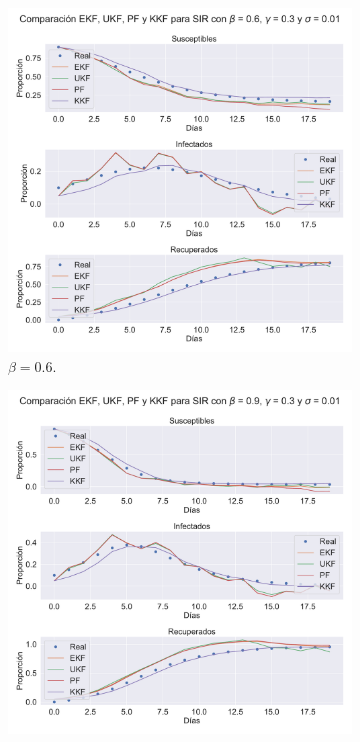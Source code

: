 \begin{figure}[h!]
    \centering
    \begin{subfigure}[b]{0.49\textwidth}
        \includegraphics[width=\linewidth]{img/content/chapter4/nonlinear_filters_sir_beta_06.pdf}
    \caption{$\beta = 0.6$.}
    \label{fig:nonlinear_filters_sir_beta_06}
    \end{subfigure}
    \begin{subfigure}[b]{0.49\textwidth}
        \includegraphics[width=\linewidth]{img/content/chapter4/nonlinear_filters_sir_beta_09.pdf}

\end{subfigure}
\end{figure}
